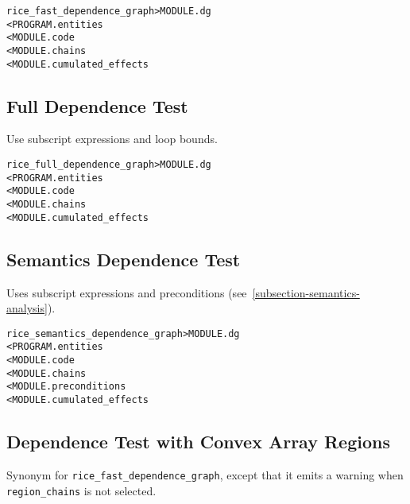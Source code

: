 \documentclass[a4paper]{report}
\newenvironment{PipsMake}{\begin{alltt}}{\end{alltt}}
\newenvironment{PipsPass}[1]{\label{pass:#1}}{}
\begin{document}
\begin{PipsMake}
rice_fast_dependence_graph      > MODULE.dg
        < PROGRAM.entities
        < MODULE.code
        < MODULE.chains
        < MODULE.cumulated_effects
\end{PipsMake}

\subsection{Full Dependence Test}
\label{subsubsection-full-dependence-test}

\begin{PipsPass}{rice_full_dependence_graph}
Use subscript expressions and loop bounds.
\end{PipsPass}

\begin{PipsMake}
rice_full_dependence_graph      > MODULE.dg
        < PROGRAM.entities
        < MODULE.code
        < MODULE.chains
        < MODULE.cumulated_effects
\end{PipsMake}


\subsection{Semantics Dependence Test}
\label{subsubsection-semantics-dependence-test}

\begin{PipsPass}{rice_semantics_dependence_graph}
Uses subscript expressions and preconditions
(see~\ref{subsection-semantics-analysis}).
\end{PipsPass}

\begin{PipsMake}
rice_semantics_dependence_graph > MODULE.dg
        < PROGRAM.entities
        < MODULE.code
        < MODULE.chains
        < MODULE.preconditions
        < MODULE.cumulated_effects
\end{PipsMake}


\subsection{Dependence Test with Convex Array Regions}
\label{subsubsection-regions-dependence-test}

\begin{PipsPass}{rice_regions_dependence_graph}
Synonym for {\tt rice\_fast\_dependence\_graph}, except that it emits a
warning when {\tt region\_chains} is not selected.
\end{PipsPass}
\end{document}
